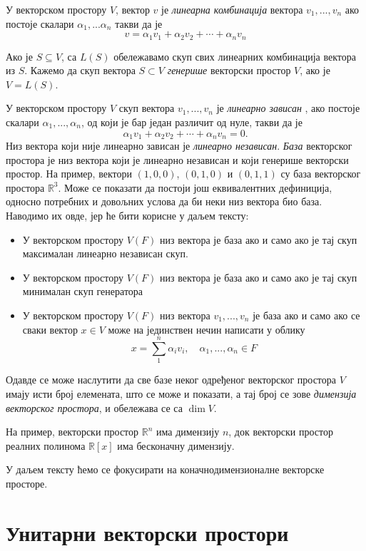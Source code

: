 \documentclass{report}
\theoremstyle{plain}
\theoremstyle{definition}
\begin{document}
У векторском простору $V$, вектор $v$ је \emph{линеарна комбинација} вектора $v_1, ..., v_n$ ако постоје скалари $\alpha_1, ...\alpha_n$ такви да је $$v = \alpha_1 v_1+ \alpha_2 v_2+ \cdots+\alpha_n v_n$$

Ако је $S\subseteq V$, са $L(S)$ обележавамо скуп свих линеарних комбинација вектора из $S$. Кажемо да скуп вектора $S\subset V$ \emph{генерише} векторски простор $V$, ако је $V = L(S)$.

У векторском простору $V$ скуп вектора $v_1, ...,v_n$ је \emph{линеарно зависан} , ако постоје скалари $\alpha_1, ...,\alpha_n$, од који је бар један различит од нуле, такви да је $$\alpha_1 v_1 + \alpha_2 v_2 + \cdots+\alpha_n v_n = 0.$$ Низ вектора који није линеарно зависан је \emph{линеарно независан}.
\emph{База} векторског простора је низ вектора који је линеарно независан и који генерише векторски простор.
На пример, вектори $(1, 0, 0)$, $(0, 1, 0)$ и $(0, 1, 1)$ су база векторског простора $\mathbb{R}^3$.
Може се показати да постоји још еквивалентних дефиниција, односно потребних и довољних услова да би неки низ вектора био база. Наводимо их овде, јер ће бити корисне у даљем тексту:
\begin{itemize}
  \item У векторском простору $V(F)$ низ вектора је база ако и само ако је тај скуп максималан линеарно независан скуп.
  \item У векторском простору $V(F)$ низ вектора је база ако и само ако је тај скуп минималан скуп генератора
  \item У векторском простору $V(F)$ низ вектора $v_1, ..., v_n$ је база ако и само ако се сваки вектор $x\in V$ може на јединствен нечин написати у облику $$x = \sum_1^n\alpha_i v_i, \quad \alpha_1, ..., \alpha_n\in F$$
\end{itemize}
Одавде се може наслутити да све базе неког одређеног векторског простора $V$ имају исти број елемената, што се може и показати, а тај број се зове \emph{димензија векторског простора}, и обележава се са $\operatorname{dim} V$.

На пример, векторски простор $\mathbb{R}^n$ има димензију $n$, док векторски простор реалних полинома $\mathbb{R}[x]$ има бесконачну димензију.

У даљем тексту ћемо се фокусирати на коначнодимензионалне векторске просторе.

\section{Унитарни векторски простори}
\end{document}
